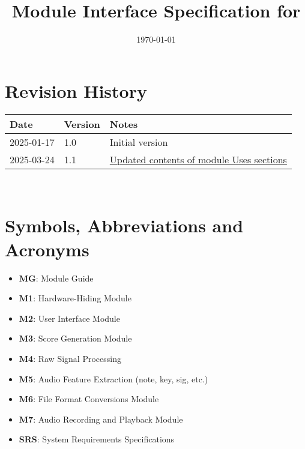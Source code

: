 \documentclass[12pt, titlepage]{article}
\begin{document}
\title{Module Interface Specification for \progname{}}

\author{\authname}

\date{\today}

\maketitle


\section{Revision History}

\begin{tabularx}{\textwidth}{p{3cm}p{2cm}X}
\toprule {\bf Date} & {\bf Version} & {\bf Notes}\\
\midrule
2025-01-17 & 1.0 & Initial version\\
2025-03-24 & 1.1 & \href{https://github.com/emilyperica/ScoreGen/issues/208}{Updated contents of module Uses sections}  \\
\bottomrule
\end{tabularx}

~\newpage

\section{Symbols, Abbreviations and Acronyms}

\begin{itemize}
    \item \textbf{MG}: Module Guide
    \item \textbf{M1}: Hardware-Hiding Module
    \item \textbf{M2}: User Interface Module
    \item \textbf{M3}: Score Generation Module
    \item \textbf{M4}: Raw Signal Processing
    \item \textbf{M5}: Audio Feature Extraction (note, key, sig, etc.)
    \item \textbf{M6}: File Format Conversions Module
    \item \textbf{M7}: Audio Recording and Playback Module
    \item \textbf{SRS}: System Requirements Specifications
    
\end{itemize}

\newpage
\end{document}
